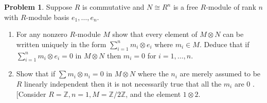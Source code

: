 \documentclass{amsart}
\numberwithin{equation}{section}
\theoremstyle{definition}
\newtheorem{problem}[thm]{Problem}
\begin{document}
\begin{problem}
  Suppose \(R\) is commutative and \(N \cong R^n\) is a free \(R\)-module of rank \(n\) with \(R\)-module basis \(e_1, \ldots, e_n\).
  \begin{enumerate}
  \item For any nonzero \(R\)-module \(M\) show that every element of \(M \otimes N\) can be written uniquely in the form \(\sum_{i=1}^n m_i \otimes e_i\) where \(m_i \in M\). Deduce that if \(\sum_{i=1}^n m_i \otimes e_i=0\) in \(M \otimes N\) then \(m_i=0\) for \(i=1, \ldots, n\).
\item Show that if \(\sum m_i \otimes n_i=0\) in \(M \otimes N\) where the \(n_i\) are merely assumed to be \(R\) linearly independent then it is not necessarily true that all the \(m_i\) are 0 . [Consider \(R=\mathbb{Z}, n=1, M=\mathbb{Z} / 2 \mathbb{Z}\), and the element \(1 \otimes 2\).
  \end{enumerate}
\end{problem}

\end{document}
